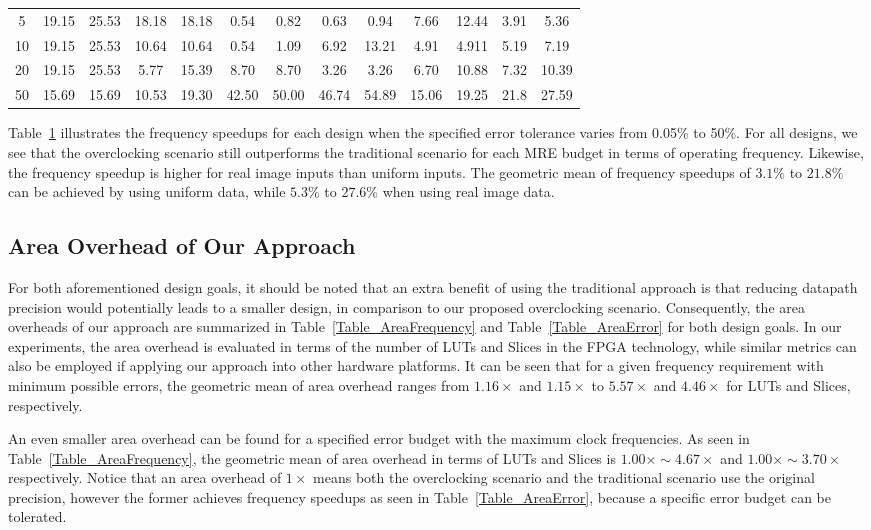 \documentclass[prodmode,acmtrets]{acmsmall} %
\begin{document}
\begin{table}[htbp]
{\begin{tabular}{|c|cc|cc|cc|cc|cc||cc|}
     5    & 19.15&	25.53&	 18.18&	18.18&	 0.54&	0.82&	 0.63&	 0.94&	 7.66&	 12.44    &3.91    &5.36\\
     10   & 19.15&	25.53&	 10.64&	10.64&	 0.54&	1.09&	 6.92&	 13.21&	 4.91&	 4.911  &5.19  &7.19\\
     20   & 19.15&	25.53&	 5.77&	15.39&	 8.70&	8.70&	 3.26&	 3.26&	 6.70&	 10.88    &7.32    &10.39\\
     50   & 15.69&	15.69&	 10.53&	19.30&	 42.50&	50.00&	 46.74&	 54.89&	 15.06&	 19.25    &21.8 &27.59\\
     \hline
   \end{tabular}}
   \normalsize
   \label{Max_Frequency}
 \end{table}

Table~\ref{Max_Frequency} illustrates the frequency speedups for each design when the specified error tolerance varies from 0.05\% to 50\%. For all designs, we see that the overclocking scenario still outperforms the traditional scenario for each MRE budget in terms of operating frequency. Likewise, the frequency speedup is higher for real image inputs than uniform inputs. The geometric mean of frequency speedups of $3.1\%$ to $21.8\%$ can be achieved by using uniform data, while $5.3\%$ to $27.6\%$ when using real image data.

\subsection{Area Overhead of Our Approach}
For both aforementioned design goals, it should be noted that an extra benefit of using the traditional approach is that reducing datapath precision would potentially leads to a smaller design, in comparison to our proposed overclocking scenario. Consequently, the area overheads of our approach are summarized in Table~\ref{Table_AreaFrequency} and Table~\ref{Table_AreaError} for both design goals. In our experiments, the area overhead is evaluated in terms of the number of LUTs and Slices in the FPGA technology, while similar metrics can also be employed if applying our approach into other hardware platforms. It can be seen that for a given frequency requirement with minimum possible errors, the geometric mean of area overhead ranges from $1.16\times$ and $1.15\times$ to $5.57\times$ and $4.46\times$ for LUTs and Slices, respectively.

An even smaller area overhead can be found for a specified error budget with the maximum clock frequencies. As seen in Table~\ref{Table_AreaFrequency}, the geometric mean of area overhead in terms of LUTs and Slices is $1.00\times\sim4.67\times$ and $1.00\times\sim3.70\times$ respectively. Notice that an area overhead of $1\times$ means both the overclocking scenario and the traditional scenario use the original precision, however the former achieves frequency speedups as seen in Table~\ref{Table_AreaError}, because a specific error budget can be tolerated.
\end{document}
